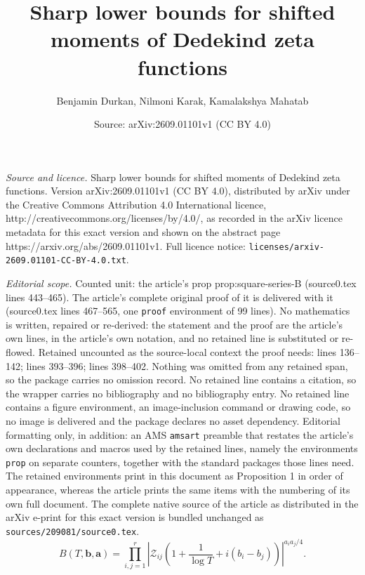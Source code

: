 \documentclass[10pt,a4paper]{amsart}
\title{Sharp lower bounds for shifted moments of Dedekind zeta functions}
\author{Benjamin Durkan, Nilmoni Karak, Kamalakshya Mahatab}
\date{Source: arXiv:2609.01101v1 (CC BY 4.0)}
\newcommand{\calZ}{\mathcal{Z}}
\begin{document}
\maketitle

\noindent\emph{Source and licence.} Sharp lower bounds for shifted moments of Dedekind zeta functions. Version arXiv:2609.01101v1 (CC BY 4.0), distributed by arXiv under the Creative Commons Attribution 4.0 International licence, http://creativecommons.org/licenses/by/4.0/, as recorded in the arXiv licence metadata for this exact version and shown on the abstract page https://arxiv.org/abs/2609.01101v1. Full licence notice: \texttt{licenses/arxiv-2609.01101-CC-BY-4.0.txt}.\par\smallskip

\noindent\textit{Editorial scope.} Counted unit: the article's prop prop:square-series-B (source0.tex lines 443--465). The article's complete original proof of it is delivered with it (source0.tex lines 467--565, one \texttt{proof} environment of 99 lines). No mathematics is written, repaired or re-derived: the statement and the proof are the article's own lines, in the article's own notation, and no retained line is substituted or re-flowed.  Retained uncounted as the source-local context the proof needs: lines 136--142; lines 393--396; lines 398--402.  Nothing was omitted from any retained span, so the package carries no omission record.  No retained line contains a citation, so the wrapper carries no bibliography and no bibliography entry.  No retained line contains a figure environment, an image-inclusion command or drawing code, so no image is delivered and the package declares no asset dependency.  Editorial formatting only, in addition: an AMS \texttt{amsart} preamble that restates the article's own declarations and macros used by the retained lines, namely the environments \texttt{prop} on separate counters, together with the standard packages those lines need.  The retained environments print in this document as Proposition 1 in order of appearance, whereas the article prints the same items with the numbering of its own full document.  The complete native source of the article as distributed in the arXiv e-print for this exact version is bundled unchanged as \texttt{sources/209081/source0.tex}.
\begin{equation}\label{eq:B-definition}
B(T,\mathbf b,\mathbf a)=
\prod_{i,j=1}^r
\left|
\calZ_{ij}\left(1+\frac{1}{\log T}+i(b_i-b_j)\right)
\right|^{a_i a_j/4}.
\end{equation}
\end{document}
